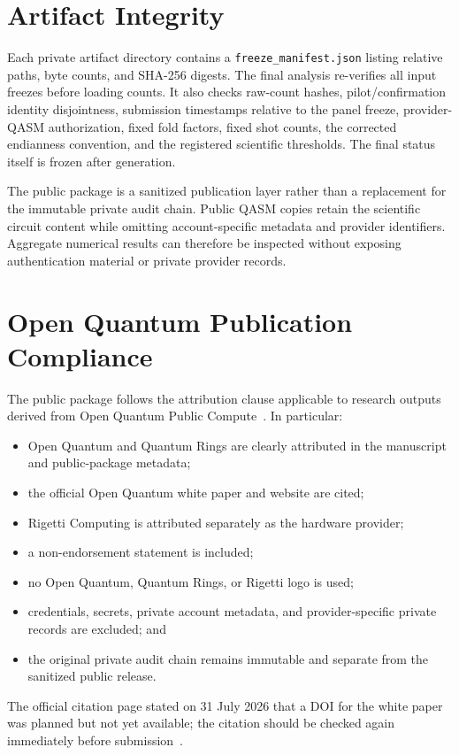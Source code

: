 \documentclass[11pt]{article}
\begin{document}
\section{Artifact Integrity}
Each private artifact directory contains a \texttt{freeze\_manifest.json} listing relative paths, byte counts, and SHA-256 digests. The final analysis re-verifies all input freezes before loading counts. It also checks raw-count hashes, pilot/confirmation identity disjointness, submission timestamps relative to the panel freeze, provider-QASM authorization, fixed fold factors, fixed shot counts, the corrected endianness convention, and the registered scientific thresholds. The final status itself is frozen after generation.

The public package is a sanitized publication layer rather than a replacement for the immutable private audit chain. Public QASM copies retain the scientific circuit content while omitting account-specific metadata and provider identifiers. Aggregate numerical results can therefore be inspected without exposing authentication material or private provider records.

\section{Open Quantum Publication Compliance}
The public package follows the attribution clause applicable to research outputs derived from Open Quantum Public Compute~\cite{quantumringsterms2026}. In particular:
\begin{itemize}
  \item Open Quantum and Quantum Rings are clearly attributed in the manuscript and public-package metadata;
  \item the official Open Quantum white paper and website are cited;
  \item Rigetti Computing is attributed separately as the hardware provider;
  \item a non-endorsement statement is included;
  \item no Open Quantum, Quantum Rings, or Rigetti logo is used;
  \item credentials, secrets, private account metadata, and provider-specific private records are excluded; and
  \item the original private audit chain remains immutable and separate from the sanitized public release.
\end{itemize}
The official citation page stated on 31 July 2026 that a DOI for the white paper was planned but not yet available; the citation should be checked again immediately before submission~\cite{openquantumcitation2026}.

\printbibliography
\end{document}
